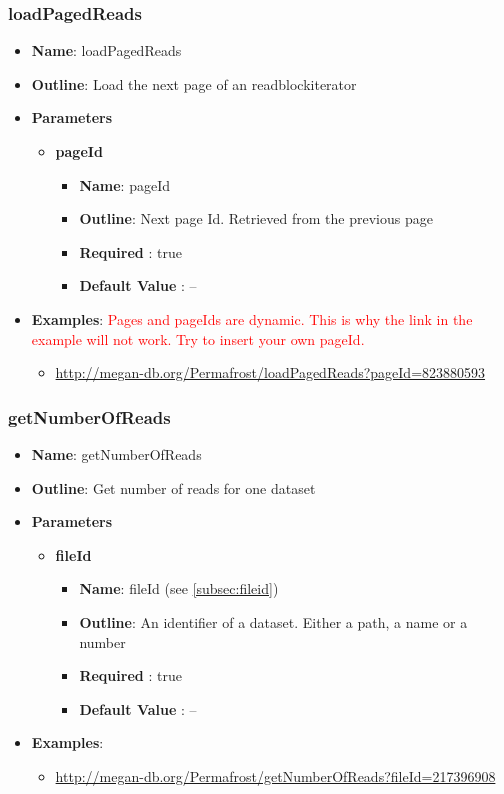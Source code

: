 \documentclass[11pt]{article}
\begin{document}
\subsubsection{loadPagedReads}

\begin{itemize}
	\item \textbf{Name}: loadPagedReads
	\item \textbf{Outline}: Load the next page of an readblockiterator
	\item \textbf{Parameters}
		\begin{itemize}
			\item \textbf{pageId}
				\begin{itemize}
					\item \textbf{Name}: pageId
					\item \textbf{Outline}: Next page Id. Retrieved from the previous page
					\item \textbf{Required} : true
					\item \textbf{Default Value} : --
				\end{itemize}
		\end{itemize}
	\item \textbf{Examples}: \textcolor{red}{Pages and pageIds are dynamic. This is why the link in the example will not work. Try to insert your own pageId.}
		\begin{itemize}
			\item \url{http://megan-db.org/Permafrost/loadPagedReads?pageId=823880593}
		\end{itemize}
\end{itemize}


\subsubsection{getNumberOfReads}

\begin{itemize}
	\item \textbf{Name}: getNumberOfReads
	\item \textbf{Outline}: Get number of reads for one dataset
	\item \textbf{Parameters}
		\begin{itemize}
			\item \textbf{fileId}
				\begin{itemize}
					\item \textbf{Name}: fileId (see \ref{subsec:fileid})
					\item \textbf{Outline}: An identifier of a dataset. Either a path, a name or a number
					\item \textbf{Required} : true
					\item \textbf{Default Value} : --
				\end{itemize}
		\end{itemize}
	\item \textbf{Examples}:
		\begin{itemize}
			\item \url{http://megan-db.org/Permafrost/getNumberOfReads?fileId=217396908}
		\end{itemize}
\end{itemize}
\end{document}
